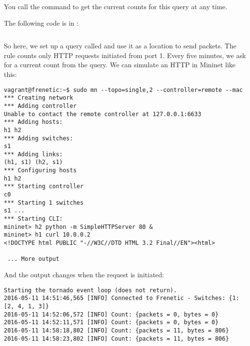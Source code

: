 You call the  command to get the current counts for this query at any time.

The following code is in :

\inputminted{python}{code/gathering_statistics/stats2.py}

So here, we set up a query called  and use it as a location to send packets.  The rule 
counts only HTTP requests initiated from port 1.  Every five minutes, we ask for a current count
from the query.  We can simulate an HTTP in Mininet like this:

\begin{verbatim}
vagrant@frenetic:~$ sudo mn --topo=single,2 --controller=remote --mac
*** Creating network
*** Adding controller
Unable to contact the remote controller at 127.0.0.1:6633
*** Adding hosts:
h1 h2
*** Adding switches:
s1
*** Adding links:
(h1, s1) (h2, s1)
*** Configuring hosts
h1 h2
*** Starting controller
c0
*** Starting 1 switches
s1 ...
*** Starting CLI:
mininet> h2 python -m SimpleHTTPServer 80 &
mininet> h1 curl 10.0.0.2
<!DOCTYPE html PUBLIC "-//W3C//DTD HTML 3.2 Final//EN"><html>

 ... More output 
\end{verbatim}

And the output changes when the request is initiated:

\begin{verbatim}
Starting the tornado event loop (does not return).
2016-05-11 14:51:46,565 [INFO] Connected to Frenetic - Switches: {1: [2, 4, 1, 3]}
2016-05-11 14:52:06,572 [INFO] Count: {packets = 0, bytes = 0}
2016-05-11 14:52:11,571 [INFO] Count: {packets = 0, bytes = 0}
2016-05-11 14:58:18,802 [INFO] Count: {packets = 11, bytes = 806}
2016-05-11 14:58:23,802 [INFO] Count: {packets = 11, bytes = 806}
\end{verbatim}
